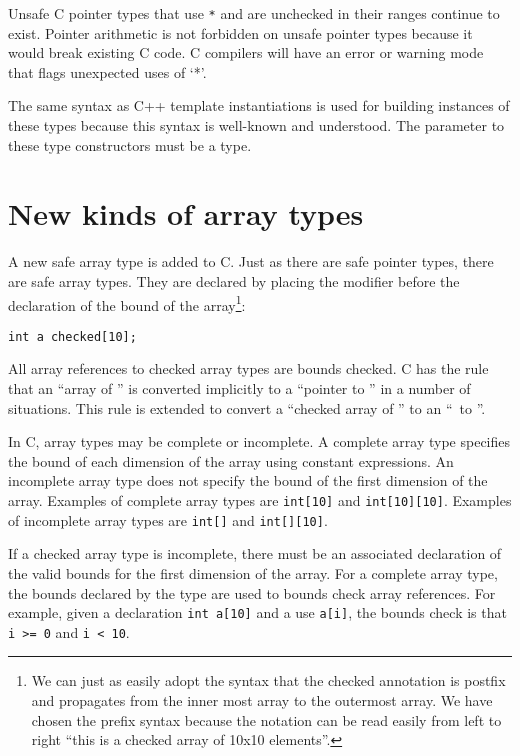 Unsafe C pointer types that use \texttt{*} and are unchecked in their
ranges continue to exist. Pointer arithmetic is not forbidden on unsafe
pointer types because it would break existing C code. C compilers will
have an error or warning mode that flags unexpected uses of `*'.

The same syntax as C++ template instantiations is used for building
instances of these types because this syntax is well-known and
understood. The parameter to these type constructors must be a type.

\section{New kinds of array types}

A new safe array type is added to C. Just as there are safe pointer
types, there are safe array types. They are declared by placing the
modifier  before the declaration of the bound of the
array\footnote{We can just as easily adopt the syntax that the checked
annotation is postfix and propagates from the inner most array to the
 outermost array. We have chosen the prefix syntax because the notation
 can be read easily from left to right ``this is a checked array of
 10x10 elements''.}:
\begin{verbatim}
int a checked[10];
\end{verbatim}

All array references to checked array types are bounds checked. C has
the rule that an ``array of '' is converted implicitly to a
``pointer to '' in a number of situations. This rule is extended
to convert a ``checked array of '' to an ``\arrayptr\ 
to ''.

In C, array types may be complete or incomplete. A complete array type
specifies the bound of each dimension of the array using constant
expressions. An incomplete array type does not specify the bound of the
first dimension of the array. Examples of complete array types are
\texttt{int[10]} and \texttt{int[10][10]}. Examples of
incomplete array types are \texttt{int[]} and \texttt{int[][10]}.

If a checked array type is incomplete, there must be an associated
declaration of the valid bounds for the first dimension of the array.
For a complete array type, the bounds declared by the type are used to
bounds check array references. For example, given a declaration
\texttt{int a[10]} and a use \texttt{a[i]}, the bounds check is
that \texttt{i >= 0} and \texttt{i < 10}.

